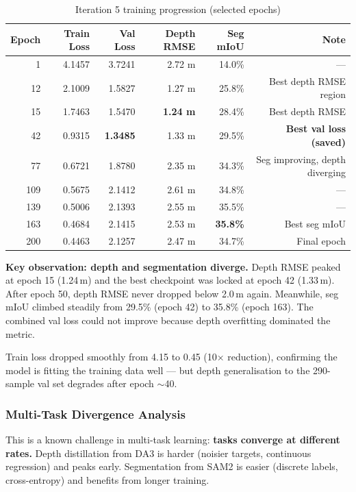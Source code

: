 \documentclass[11pt,a4paper]{article}
\begin{document}
\begin{table}[h]
\centering
\caption{Iteration 5 training progression (selected epochs)}
\label{tab:iter5-training}
\begin{tabular}{rrrrrr}
\toprule
\textbf{Epoch} & \textbf{Train Loss} & \textbf{Val Loss} & \textbf{Depth RMSE} & \textbf{Seg mIoU} & \textbf{Note} \\
\midrule
1    & 4.1457 & 3.7241 & 2.72 m & 14.0\% & --- \\
12   & 2.1009 & 1.5827 & 1.27 m & 25.8\% & Best depth RMSE region \\
15   & 1.7463 & 1.5470 & \textcolor{improved}{\textbf{1.24 m}} & 28.4\% & Best depth RMSE \\
42   & 0.9315 & \textcolor{improved}{\textbf{1.3485}} & 1.33 m & 29.5\% & \textbf{Best val loss (saved)} \\
77   & 0.6721 & 1.8780 & 2.35 m & 34.3\% & Seg improving, depth diverging \\
109  & 0.5675 & 2.1412 & 2.61 m & 34.8\% & --- \\
139  & 0.5006 & 2.1393 & 2.55 m & 35.5\% & --- \\
163  & 0.4684 & 2.1415 & 2.53 m & \textcolor{improved}{\textbf{35.8\%}} & Best seg mIoU \\
200  & 0.4463 & 2.1257 & 2.47 m & 34.7\% & Final epoch \\
\bottomrule
\end{tabular}
\end{table}

\textbf{Key observation: depth and segmentation diverge.} Depth RMSE
peaked at epoch 15 (1.24\,m) and the best checkpoint was locked at
epoch 42 (1.33\,m). After epoch 50, depth RMSE never dropped below
2.0\,m again. Meanwhile, seg mIoU climbed steadily from 29.5\% (epoch
42) to 35.8\% (epoch 163). The combined val loss could not improve
because depth overfitting dominated the metric.

Train loss dropped smoothly from 4.15 to 0.45 (10$\times$ reduction),
confirming the model is fitting the training data well --- but depth
generalisation to the 290-sample val set degrades after epoch $\sim$40.

\subsubsection{Multi-Task Divergence Analysis}

This is a known challenge in multi-task learning: \textbf{tasks converge
at different rates.} Depth distillation from DA3 is harder (noisier
targets, continuous regression) and peaks early. Segmentation from SAM2
is easier (discrete labels, cross-entropy) and benefits from longer
training.
\end{document}
